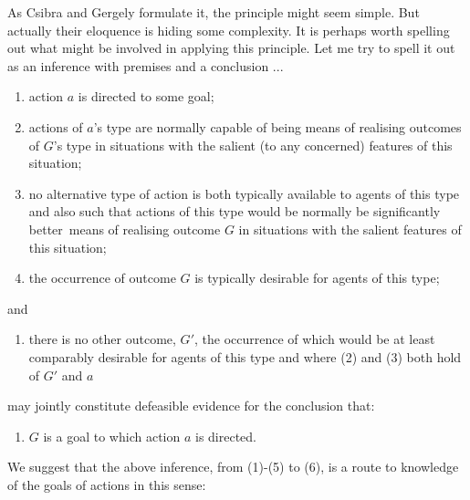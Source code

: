 \documentclass[12pt,\papersize]{extarticle}
\begin{document}
As Csibra and Gergely formulate it, the principle might seem simple.
But actually their eloquence is hiding some complexity.
It is perhaps worth spelling out what might be involved in applying this principle.
Let me try to spell it out as an inference with premises and a conclusion ...
%
\begin{enumerate}
%
\item action $a$ is directed to some goal;
%
\item actions of $a$'s type are normally capable of being means of realising outcomes of $G$'s type in situations with the salient (to any concerned) features of this situation;
% 
\item no alternative type of action is both 
typically available to agents of this type 
and also 
such that actions of this type would be normally be significantly better\footnotemark \ means of realising outcome $G$ in situations with the salient features of this situation;
%
\item the occurrence of outcome $G$ is typically desirable for agents of this type;
%
\end{enumerate}
%
and
%
\begin{enumerate}[resume]
\item there is no other outcome, $G'$, 
the occurrence of which would be at least comparably desirable for agents of this type 
and where (2) and (3) both hold of $G'$ and $a$
%
\end{enumerate}
%
may jointly constitute defeasible evidence for the conclusion that:
%
\begin{enumerate}[resume]
\item $G$ is a goal to which action $a$ is directed.
\end{enumerate}
%
We suggest that the above inference, from (1)-(5) to (6), is a route to knowledge of the goals of actions in this sense:
\end{document}
